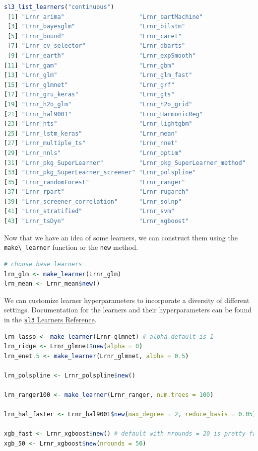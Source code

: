 \documentclass[
  12pt, krantz2,
]{book}
\newcommand{\passthrough}[1]{#1}
\theoremstyle{definition}
\theoremstyle{definition}
\theoremstyle{definition}
\newcommand{\1}{\mathbbm{1}}
\begin{document}
\begin{lstlisting}[language=R]
sl3_list_learners("continuous")
 [1] "Lrnr_arima"                     "Lrnr_bartMachine"              
 [3] "Lrnr_bayesglm"                  "Lrnr_bilstm"                   
 [5] "Lrnr_bound"                     "Lrnr_caret"                    
 [7] "Lrnr_cv_selector"               "Lrnr_dbarts"                   
 [9] "Lrnr_earth"                     "Lrnr_expSmooth"                
[11] "Lrnr_gam"                       "Lrnr_gbm"                      
[13] "Lrnr_glm"                       "Lrnr_glm_fast"                 
[15] "Lrnr_glmnet"                    "Lrnr_grf"                      
[17] "Lrnr_gru_keras"                 "Lrnr_gts"                      
[19] "Lrnr_h2o_glm"                   "Lrnr_h2o_grid"                 
[21] "Lrnr_hal9001"                   "Lrnr_HarmonicReg"              
[23] "Lrnr_hts"                       "Lrnr_lightgbm"                 
[25] "Lrnr_lstm_keras"                "Lrnr_mean"                     
[27] "Lrnr_multiple_ts"               "Lrnr_nnet"                     
[29] "Lrnr_nnls"                      "Lrnr_optim"                    
[31] "Lrnr_pkg_SuperLearner"          "Lrnr_pkg_SuperLearner_method"  
[33] "Lrnr_pkg_SuperLearner_screener" "Lrnr_polspline"                
[35] "Lrnr_randomForest"              "Lrnr_ranger"                   
[37] "Lrnr_rpart"                     "Lrnr_rugarch"                  
[39] "Lrnr_screener_correlation"      "Lrnr_solnp"                    
[41] "Lrnr_stratified"                "Lrnr_svm"                      
[43] "Lrnr_tsDyn"                     "Lrnr_xgboost"                  
\end{lstlisting}

Now that we have an idea of some learners, we can construct them using the
\passthrough{\lstinline!make\_learner!} function or the \passthrough{\lstinline!new!} method.

\begin{lstlisting}[language=R]
# choose base learners
lrn_glm <- make_learner(Lrnr_glm)
lrn_mean <- Lrnr_mean$new()
\end{lstlisting}

We can customize learner hyperparameters to incorporate a diversity of different
settings. Documentation for the learners and their hyperparameters can be found
in the \href{https://tlverse.org/sl3/reference/index.html\#section-sl-learners}{\passthrough{\lstinline!sl3!} Learners
Reference}.

\begin{lstlisting}[language=R]
lrn_lasso <- make_learner(Lrnr_glmnet) # alpha default is 1
lrn_ridge <- Lrnr_glmnet$new(alpha = 0)
lrn_enet.5 <- make_learner(Lrnr_glmnet, alpha = 0.5)

lrn_polspline <- Lrnr_polspline$new()

lrn_ranger100 <- make_learner(Lrnr_ranger, num.trees = 100)

lrn_hal_faster <- Lrnr_hal9001$new(max_degree = 2, reduce_basis = 0.05)

xgb_fast <- Lrnr_xgboost$new() # default with nrounds = 20 is pretty fast
xgb_50 <- Lrnr_xgboost$new(nrounds = 50)
\end{lstlisting}
\end{document}
